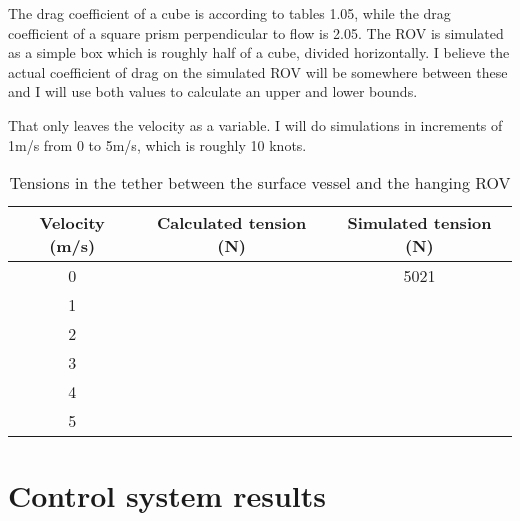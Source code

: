 The drag coefficient of a cube is according to tables 1.05, while the drag coefficient of a square prism perpendicular to flow is 2.05. The ROV is simulated as a simple box which is roughly half of a cube, divided horizontally. I believe the actual coefficient of drag on the simulated ROV will be somewhere between these and I will use both values to calculate an upper and lower bounds. 

That only leaves the velocity as a variable. I will do simulations in increments of 1m/s from 0 to 5m/s, which is roughly 10 knots. 

\begin{table}
\begin{tabular}{c c c}
Velocity (m/s) & Calculated tension (N) & Simulated tension (N) \\
\hline
0 & & 5021 \\
1 & & \\
2 & & \\
3 & & \\
4 & & \\
5 & &
\end{tabular}
\caption{Tensions in the tether between the surface vessel and the hanging ROV}
\label{tab:tension}
\end{table}




\section{Control system results}
